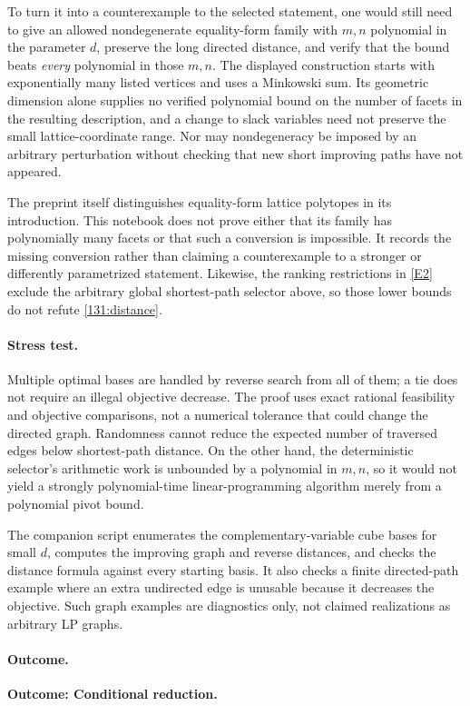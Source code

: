 \documentclass[11pt,a4paper]{article}
\newcommand{\eref}[2]{\hyperlink{extra:#1:#2}{[E#2]}}
\numberwithin{equation}{section}
\begin{document}
To turn it into a counterexample to the selected statement, one would
still need to give an allowed nondegenerate equality-form family with
$m,n$ polynomial in the parameter $d$, preserve the long directed
distance, and verify that the bound beats \emph{every} polynomial in
those $m,n$.  The displayed construction starts with exponentially
many listed vertices and uses a Minkowski sum.  Its geometric dimension
alone supplies no verified polynomial bound on the number of facets
in the resulting description, and a change to slack variables need
not preserve the small lattice-coordinate range.  Nor may
nondegeneracy be imposed by an arbitrary perturbation without checking
that new short improving paths have not appeared.

The preprint itself distinguishes equality-form lattice polytopes in
its introduction.  This notebook does not prove either that its family
has polynomially many facets or that such a conversion is impossible.
It records the missing conversion rather than claiming a counterexample
to a stronger or differently parametrized statement.  Likewise, the
ranking restrictions in \eref{131}{2} exclude the arbitrary global
shortest-path selector above, so those lower bounds do not refute
\eqref{131:distance}.

\paragraph{Stress test.}
Multiple optimal bases are handled by reverse search from all of them;
a tie does not require an illegal objective decrease.  The proof uses
exact rational feasibility and objective comparisons, not a numerical
tolerance that could change the directed graph.  Randomness cannot
reduce the expected number of traversed edges below shortest-path
distance.  On the other hand, the deterministic selector's arithmetic
work is unbounded by a polynomial in $m,n$, so it would not yield a
strongly polynomial-time linear-programming algorithm merely from a
polynomial pivot bound.

The companion script enumerates the complementary-variable cube bases
for small $d$, computes the improving graph and reverse distances, and
checks the distance formula against every starting basis.  It also
checks a finite directed-path example where an extra undirected edge
is unusable because it decreases the objective.  Such graph examples
are diagnostics only, not claimed realizations as arbitrary LP graphs.

\paragraph{Outcome.}
\textbf{Outcome: Conditional reduction.}
\end{document}
